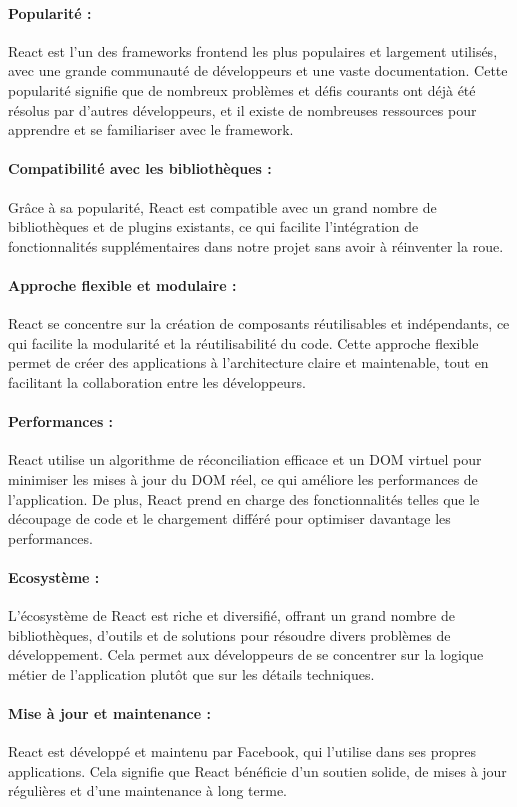 \paragraph{Popularité :} React est l'un des frameworks frontend les plus populaires et largement utilisés, avec une grande communauté de développeurs et une vaste documentation. Cette popularité signifie que de nombreux problèmes et défis courants ont déjà été résolus par d'autres développeurs, et il existe de nombreuses ressources pour apprendre et se familiariser avec le framework.
\paragraph{Compatibilité avec les bibliothèques :} Grâce à sa popularité, React est compatible avec un grand nombre de bibliothèques et de plugins existants, ce qui facilite l'intégration de fonctionnalités supplémentaires dans notre projet sans avoir à réinventer la roue.
\paragraph{Approche flexible et modulaire :} React se concentre sur la création de composants réutilisables et indépendants, ce qui facilite la modularité et la réutilisabilité du code. Cette approche flexible permet de créer des applications à l'architecture claire et maintenable, tout en facilitant la collaboration entre les développeurs.
\paragraph{Performances :} React utilise un algorithme de réconciliation efficace et un DOM virtuel pour minimiser les mises à jour du DOM réel, ce qui améliore les performances de l'application. De plus, React prend en charge des fonctionnalités telles que le découpage de code et le chargement différé pour optimiser davantage les performances.

\paragraph{Ecosystème :} L'écosystème de React est riche et diversifié, offrant un grand nombre de bibliothèques, d'outils et de solutions pour résoudre divers problèmes de développement. Cela permet aux développeurs de se concentrer sur la logique métier de l'application plutôt que sur les détails techniques.

\paragraph{Mise à jour et maintenance :} React est développé et maintenu par Facebook, qui l'utilise dans ses propres applications. Cela signifie que React bénéficie d'un soutien solide, de mises à jour régulières et d'une maintenance à long terme.

